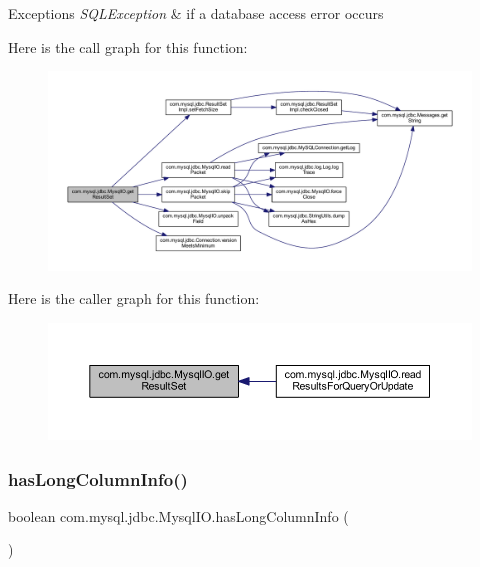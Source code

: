 \begin{DoxyExceptions}{Exceptions}
{\em S\+Q\+L\+Exception} & if a database access error occurs \\
\hline
\end{DoxyExceptions}
Here is the call graph for this function\+:
\nopagebreak
\begin{figure}[H]
\begin{center}
\leavevmode
\includegraphics[width=350pt]{classcom_1_1mysql_1_1jdbc_1_1_mysql_i_o_a73c871988cf4c69bf78db472e6a7713f_cgraph}
\end{center}
\end{figure}
Here is the caller graph for this function\+:
\nopagebreak
\begin{figure}[H]
\begin{center}
\leavevmode
\includegraphics[width=350pt]{classcom_1_1mysql_1_1jdbc_1_1_mysql_i_o_a73c871988cf4c69bf78db472e6a7713f_icgraph}
\end{center}
\end{figure}
\mbox{\label{classcom_1_1mysql_1_1jdbc_1_1_mysql_i_o_a128a14ef2f35a39db63a1e8cf5bf772b}} 
\subsubsection{\texorpdfstring{has\+Long\+Column\+Info()}{hasLongColumnInfo()}}
{\footnotesize\ttfamily boolean com.\+mysql.\+jdbc.\+Mysql\+I\+O.\+has\+Long\+Column\+Info (\begin{DoxyParamCaption}{ }\end{DoxyParamCaption})}

